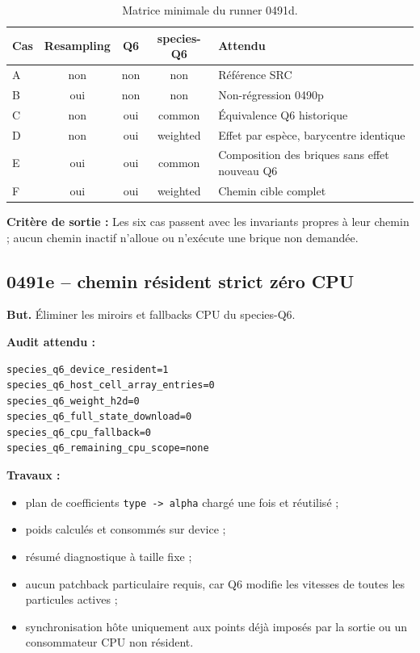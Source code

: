 \documentclass[11pt,a4paper]{article}
\newcommand{\code}[1]{\texttt{#1}}
\newcommand{\criterion}[1]{\colorbox{softgreen}{\parbox{0.93\linewidth}{\textbf{Critère de sortie :} #1}}}
\begin{document}
\begin{table}[H]
\centering
\caption{Matrice minimale du runner 0491d.}
\begin{tabular}{@{}lcccl@{}}
\toprule
Cas & Resampling & Q6 & species-Q6 & Attendu \\
\midrule
A & non & non & non & Référence SRC \\
B & oui & non & non & Non-régression 0490p \\
C & non & oui & common & Équivalence Q6 historique \\
D & non & oui & weighted & Effet par espèce, barycentre identique \\
E & oui & oui & common & Composition des briques sans effet nouveau Q6 \\
F & oui & oui & weighted & Chemin cible complet \\
\bottomrule
\end{tabular}
\end{table}

\criterion{Les six cas passent avec les invariants propres à leur chemin ; aucun chemin inactif n'alloue ou n'exécute une brique non demandée.}

\subsection{0491e -- chemin résident strict zéro CPU}

\textbf{But.} Éliminer les miroirs et fallbacks CPU du species-Q6.

\textbf{Audit attendu :}
\begin{lstlisting}
species_q6_device_resident=1
species_q6_host_cell_array_entries=0
species_q6_weight_h2d=0
species_q6_full_state_download=0
species_q6_cpu_fallback=0
species_q6_remaining_cpu_scope=none
\end{lstlisting}

\textbf{Travaux :}
\begin{itemize}
  \item plan de coefficients \code{type -> alpha} chargé une fois et réutilisé ;
  \item poids calculés et consommés sur device ;
  \item résumé diagnostique à taille fixe ;
  \item aucun patchback particulaire requis, car Q6 modifie les vitesses de toutes les particules actives ;
  \item synchronisation hôte uniquement aux points déjà imposés par la sortie ou un consommateur CPU non résident.
\end{itemize}
\end{document}
